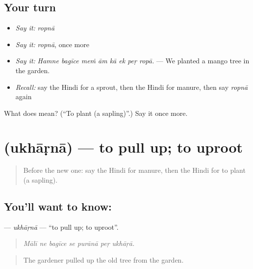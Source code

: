 \subsection*{Your turn}
\begin{itemize}
\raggedright
  \item \emph{Say it:} \emph{ropnā}
  \item \emph{Say it:} \emph{ropnā}, once more
  \item \emph{Say it:} \emph{Hamne bagīce meṁ ām kā ek peṛ ropā.} — We planted a mango tree in the garden.
  \item \emph{Recall:} say the Hindi for a sprout, then the Hindi for manure, then say \emph{ropnā} again
\end{itemize}

\begin{tcolorbox}[breakable,colback=teal!4,colframe=teal!35!black,title={Before you move on}]
What does  mean? (\textquotedblleft{}To plant (a sapling)\textquotedblright{}.) Say it once more.
\end{tcolorbox}
\section[\texorpdfstring{\hi{उखाड़ना} (ukhāṛnā)}{उखाड़ना (ukhāṛnā)}]{ (ukhāṛnā) — to pull up; to uproot}

\label{lesson:HI-C525-ukhaarna}



\begin{quote}
Before the new one: say the Hindi for manure, then the Hindi for to plant (a sapling).
\end{quote}

\subsection*{You'll want to know: }
\textbf{} — \emph{ukhāṛnā} — \textquotedblleft{}to pull up; to uproot\textquotedblright{}.

\begin{quote}
      
\end{quote}

\begin{quote}
\emph{Mālī ne bagīce se purānā peṛ ukhāṛā.}
\end{quote}

\begin{quote}
The gardener pulled up the old tree from the garden.
\end{quote}

